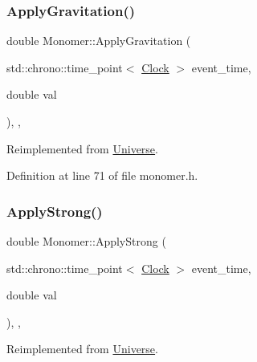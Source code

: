 \mbox{\label{class_monomer_a8747945cc2f7abd7ce0885345ad14ebc}} 
\subsubsection{\texorpdfstring{Apply\+Gravitation()}{ApplyGravitation()}}
{\footnotesize\ttfamily double Monomer\+::\+Apply\+Gravitation (\begin{DoxyParamCaption}\item[{std\+::chrono\+::time\+\_\+point$<$ \hyperlink{universe_8h_a0ef8d951d1ca5ab3cfaf7ab4c7a6fd80}{Clock} $>$}]{event\+\_\+time,  }\item[{double}]{val }\end{DoxyParamCaption})\hspace{0.3cm}{\ttfamily [inline]}, {\ttfamily [final]}, {\ttfamily [virtual]}}



Reimplemented from \hyperlink{class_universe_a76c0b5e63c2a7d1988c44db341c3d64c}{Universe}.



Definition at line 71 of file monomer.\+h.

\mbox{\label{class_monomer_acba5091693082fdf2d28f1a5a4ae19a1}} 
\subsubsection{\texorpdfstring{Apply\+Strong()}{ApplyStrong()}}
{\footnotesize\ttfamily double Monomer\+::\+Apply\+Strong (\begin{DoxyParamCaption}\item[{std\+::chrono\+::time\+\_\+point$<$ \hyperlink{universe_8h_a0ef8d951d1ca5ab3cfaf7ab4c7a6fd80}{Clock} $>$}]{event\+\_\+time,  }\item[{double}]{val }\end{DoxyParamCaption})\hspace{0.3cm}{\ttfamily [inline]}, {\ttfamily [final]}, {\ttfamily [virtual]}}



Reimplemented from \hyperlink{class_universe_a906a88b37f10bfa630bef49dfd0e907a}{Universe}.



